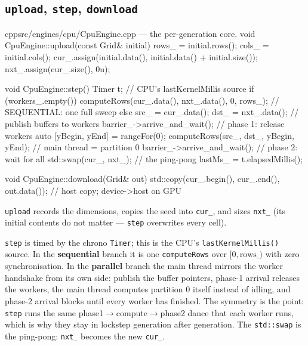\documentclass[
	english,
	letterpaper, oneside
]{article}
\begin{document}
\subsection{\texttt{upload}, \texttt{step}, \texttt{download}}

\begin{sourcecode}{cpp}{src/engines/cpu/CpuEngine.cpp --- the per-generation core.}
void CpuEngine::upload(const Grid& initial) {
  rows_ = initial.rows();  cols_ = initial.cols();
  cur_.assign(initial.data(), initial.data() + initial.size());
  nxt_.assign(cur_.size(), 0u);
}

void CpuEngine::step() {
  Timer t;                                            // CPU's lastKernelMillis source
  if (workers_.empty()) {
    computeRows(cur_.data(), nxt_.data(), 0, rows_);  // SEQUENTIAL: one full sweep
  } else {
    src_ = cur_.data();  dst_ = nxt_.data();          // publish buffers to workers
    barrier_->arrive_and_wait();                      // phase 1: release workers
    auto [yBegin, yEnd] = rangeFor(0);
    computeRows(src_, dst_, yBegin, yEnd);            // main thread = partition 0
    barrier_->arrive_and_wait();                      // phase 2: wait for all
  }
  std::swap(cur_, nxt_);                              // the ping-pong
  lastMs_ = t.elapsedMillis();
}

void CpuEngine::download(Grid& out) {
  std::copy(cur_.begin(), cur_.end(), out.data());   // host copy; device->host on GPU
}
\end{sourcecode}

\texttt{upload} records the dimensions, copies the seed into \texttt{cur\_}, and
sizes \texttt{nxt\_} (its initial contents do not matter --- \texttt{step}
overwrites every cell).

\texttt{step} is timed by the chrono \texttt{Timer}; this is the CPU's
\texttt{lastKernelMillis()} source. In the \textbf{sequential} branch it is one
\texttt{computeRows} over $[0,\text{rows\_})$ with zero synchronisation. In the
\textbf{parallel} branch the main thread mirrors the worker handshake from its
own side: publish the buffer pointers, phase-1 arrival releases the workers, the
main thread computes partition 0 itself instead of idling, and phase-2 arrival
blocks until every worker has finished. The symmetry is the point: \texttt{step}
runs the same phase1$\rightarrow$compute$\rightarrow$phase2 dance that each
worker runs, which is why they stay in lockstep generation after generation. The
\texttt{std::swap} is the ping-pong: \texttt{nxt\_} becomes the new
\texttt{cur\_}.
\end{document}
